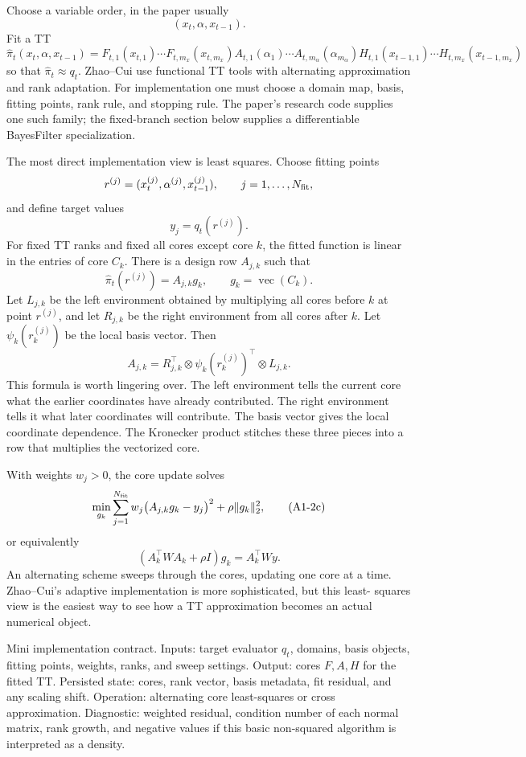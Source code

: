 \documentclass[11pt]{article}
\newcommand{\vecop}{\operatorname{vec}}
\begin{document}
Choose a variable order, in the paper usually
\[
    (x_t,\alpha,x_{t-1}).
\]
Fit a TT
\[
    \widehat\pi_t(x_t,\alpha,x_{t-1})
    =
    F_{t,1}(x_{t,1})\cdots F_{t,m_x}(x_{t,m_x})
    A_{t,1}(\alpha_1)\cdots A_{t,m_\alpha}(\alpha_{m_\alpha})
    H_{t,1}(x_{t-1,1})\cdots H_{t,m_x}(x_{t-1,m_x})
    \tag{A1-2}
\]
so that \(\widehat\pi_t\approx q_t\).  Zhao--Cui use functional TT tools with
alternating approximation and rank adaptation.  For implementation one must
choose a domain map, basis, fitting points, rank rule, and stopping rule.  The
paper's research code supplies one such family; the fixed-branch section below
supplies a differentiable BayesFilter specialization.

The most direct implementation view is least squares.  Choose fitting points
\[
    r^{(j)}=(x_t^{(j)},\alpha^{(j)},x_{t-1}^{(j)}),
    \qquad j=1,\ldots,N_{\rm fit},
\]
and define target values
\[
    y_j=q_t(r^{(j)}).
\]
For fixed TT ranks and fixed all cores except core \(k\), the fitted function is
linear in the entries of core \(C_k\).  There is a design row \(A_{j,k}\) such
that
\[
    \widehat\pi_t(r^{(j)})=A_{j,k}g_k,
    \qquad g_k=\vecop(C_k).
    \tag{A1-2a}
\]
Let \(L_{j,k}\) be the left environment obtained by multiplying all cores before
\(k\) at point \(r^{(j)}\), and let \(R_{j,k}\) be the right environment from
all cores after \(k\).  Let
\(\psi_k(r_k^{(j)})\) be the local basis vector.  Then
\[
    A_{j,k}
    =
    R_{j,k}^{\top}\otimes \psi_k(r_k^{(j)})^\top\otimes L_{j,k}.
    \tag{A1-2b}
\]
This formula is worth lingering over.  The left environment tells the current
core what the earlier coordinates have already contributed.  The right
environment tells it what later coordinates will contribute.  The basis vector
gives the local coordinate dependence.  The Kronecker product stitches these
three pieces into a row that multiplies the vectorized core.

With weights \(w_j>0\), the core update solves
\[
    \min_{g_k}
    \sum_{j=1}^{N_{\rm fit}}w_j\bigl(A_{j,k}g_k-y_j\bigr)^2
    +\rho\|g_k\|_2^2,
    \tag{A1-2c}
\]
or equivalently
\[
    (A_k^\top W A_k+\rho I)g_k=A_k^\top Wy.
    \tag{A1-2d}
\]
An alternating scheme sweeps through the cores, updating one core at a time.
Zhao--Cui's adaptive implementation is more sophisticated, but this least-
squares view is the easiest way to see how a TT approximation becomes an
actual numerical object.

Mini implementation contract.  Inputs: target evaluator \(q_t\), domains,
basis objects, fitting points, weights, ranks, and sweep settings.  Output:
cores \(F,A,H\) for the fitted TT.  Persisted state: cores, rank vector, basis
metadata, fit residual, and any scaling shift.  Operation: alternating core
least-squares or cross approximation.  Diagnostic: weighted residual, condition
number of each normal matrix, rank growth, and negative values if this basic
non-squared algorithm is interpreted as a density.
\end{document}
